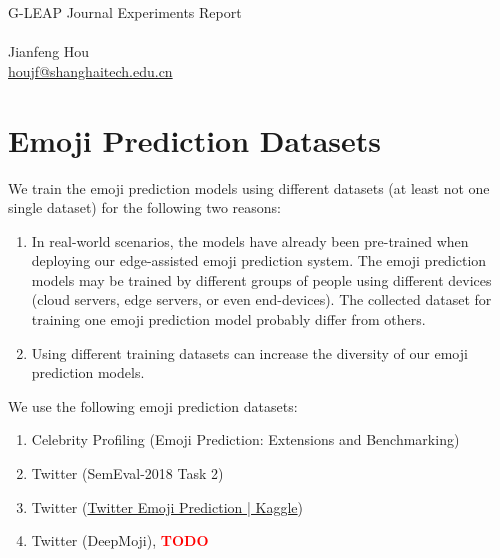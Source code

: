 \documentclass[12pt, a4paper]{article}
\begin{document}
\begin{center}
    \vspace*{2cm}
    {\textcolor{MyTitleColor}{
            \fontsize{40}{48}\philosopher\selectfont
            G-LEAP Journal Experiments Report}}\\[\baselineskip]
    \vspace*{1cm}
    {\fontsize{20}{24}\barlow{}}\\[\baselineskip]
    \vspace*{3cm}
    {\fontsize{16}{19.2}\selectfont Jianfeng Hou}\\[\baselineskip]
    {\fontsize{16}{19.2}\selectfont\hypersetup{linkcolor=black, urlcolor=black} \href{mailto:houjf@shanghaitech.edu.cn}{houjf@shanghaitech.edu.cn}}\\[\baselineskip]
    \vfill
\end{center}

\thispagestyle{empty}

\newpage


\section{Emoji Prediction Datasets}

We train the emoji prediction models using different datasets (at least not one single dataset) for the following two reasons:
\begin{enumerate}
	\item In real-world scenarios, the models have already been pre-trained when deploying our edge-assisted emoji prediction system. The emoji prediction models may be trained by different groups of people using different devices (cloud servers, edge servers, or even end-devices). The collected dataset for training one emoji prediction model probably differ from others.
	
	\item Using different training datasets can increase the diversity of our emoji prediction models.
\end{enumerate}

We use the following emoji prediction datasets:
\begin{enumerate}
	\item Celebrity Profiling (Emoji Prediction: Extensions and Benchmarking)
	
	\item Twitter (SemEval-2018 Task 2)
	
	\item Twitter (\href{https://www.kaggle.com/hariharasudhanas/twitter-emoji-prediction}{Twitter Emoji Prediction | Kaggle})
	
	\item Twitter (DeepMoji), \textbf{\textcolor{red}{TODO}}
\end{enumerate}
\end{document}
